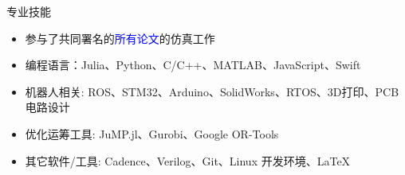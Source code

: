 \documentclass{resume} %
\begin{document}
\begin{rSection}{专业技能}
    \begin{itemize}
        \item 参与了共同署名的\textcolor{blue}{所有论文}的仿真工作
        \item 编程语言：Julia、Python、C/C++、MATLAB、JavaScript、Swift
        \item 机器人相关: ROS、STM32、Arduino、SolidWorks、RTOS、3D打印、PCB电路设计
        \item 优化运筹工具: JuMP.jl、Gurobi、Google OR-Tools
        \item 其它软件/工具: Cadence、Verilog、Git、Linux 开发环境、LaTeX
    \end{itemize} 
\end{rSection}



\end{document}
